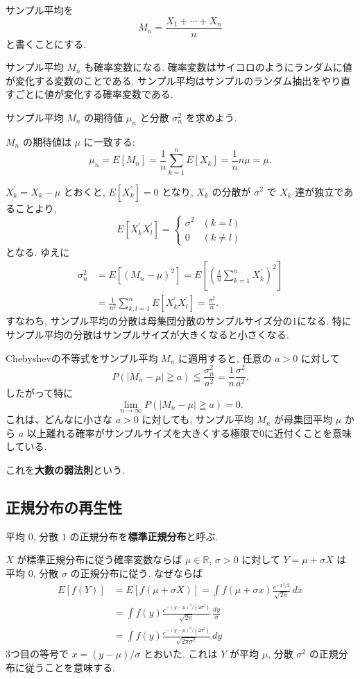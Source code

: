 \documentclass[12pt,twoside]{jarticle}
\newcommand\R{{\mathbb R}} %
\theoremstyle{jplain}
\theoremstyle{jplain}
\theoremstyle{jplain}
\numberwithin{theorem}{section}
\numberwithin{equation}{section}
\numberwithin{figure}{section}
\numberwithin{table}{section}
\begin{document}
サンプル平均を
$$
M_n = \frac{X_1+\cdots+X_n}n
$$
と書くことにする.

サンプル平均 $M_n$ も確率変数になる. 確率変数はサイコロのようにランダムに値が変化する変数のことである. サンプル平均はサンプルのランダム抽出をやり直すごとに値が変化する確率変数である.

サンプル平均 $M_n$ の期待値 $\mu_n$ と分散 $\sigma_n^2$ を求めよう.

$M_n$ の期待値は $\mu$ に一致する:
$$
\mu_n = E[M_n]=\frac1n\sum_{k=1}^n E[X_k]=\frac1n n\mu=\mu.
$$

$X^\prime_k=X_k-\mu$ とおくと,  $E[X^\prime_k]=0$ となり, $X_k$ の分散が $\sigma^2$ で $X_k$ 達が独立であることより,
$$
E[X^\prime_k X^\prime_l]=
\begin{cases}
\sigma^2 & (k=l)\\
0 & (k\ne l)
\end{cases}
$$
となる. ゆえに
\begin{align*}
\sigma_n^2
&=E[(M_n-\mu)^2]
=E\left[\left(\frac1n\sum_{k=1}^n X^\prime_k\right)^2\right]\\
&=\frac1{n^2}\sum_{k,l=1}^nE[X^\prime_k X^\prime_l]
=\frac{\sigma^2}n.
\end{align*}
すなわち, サンプル平均の分散は母集団分散のサンプルサイズ分の1になる. 特にサンプル平均の分散はサンプルサイズが大きくなると小さくなる.

Chebyshevの不等式をサンプル平均 $M_n$ に適用すると, 任意の $a >0$ に対して
$$
P(|M_n-\mu|\geqq a)
\leqq \frac{\sigma_n^2}{a^2}
=\frac1n \frac{\sigma^2}{a^2}.
$$
したがって特に
$$
\lim_{n\to\infty}P(|M_n-\mu|\geqq a) = 0.
$$
これは、どんなに小さな $a >0$ に対しても, サンプル平均 $M_n$ が母集団平均 $\mu$ から $a$ 以上離れる確率がサンプルサイズを大きくする極限で0に近付くことを意味している.

これを{\bfseries 大数の弱法則}という.

\subsection{正規分布の再生性}

平均 $0$, 分散 $1$ の正規分布を{\bfseries 標準正規分布}と呼ぶ.

$X$ が標準正規分布に従う確率変数ならば $\mu\in\R$, $\sigma >0$ に対して $Y=\mu+\sigma X$ は平均 $0$, 分散 $\sigma$ の正規分布に従う. なぜならば
\begin{align*}
E[f(Y)]
&=E[f(\mu+\sigma X)]
=\int f(\mu+\sigma x)\frac{e^{-x^2/2}}{\sqrt{2\pi}}\,dx\\
&=\int f(y)\frac{e^{-(y-\mu)^2/(2\sigma^2)}}{\sqrt{2\pi}}\,\frac{dy}{\sigma}\\
&=\int f(y)\frac{e^{-(y-\mu)^2/(2\sigma^2)}}{\sqrt{2\pi\sigma^2}}\,dy
\end{align*}
3つ目の等号で $x=(y-\mu)/\sigma$ とおいた. これは $Y$ が平均 $\mu$, 分散 $\sigma^2$ の正規分布に従うことを意味する.
\end{document}
